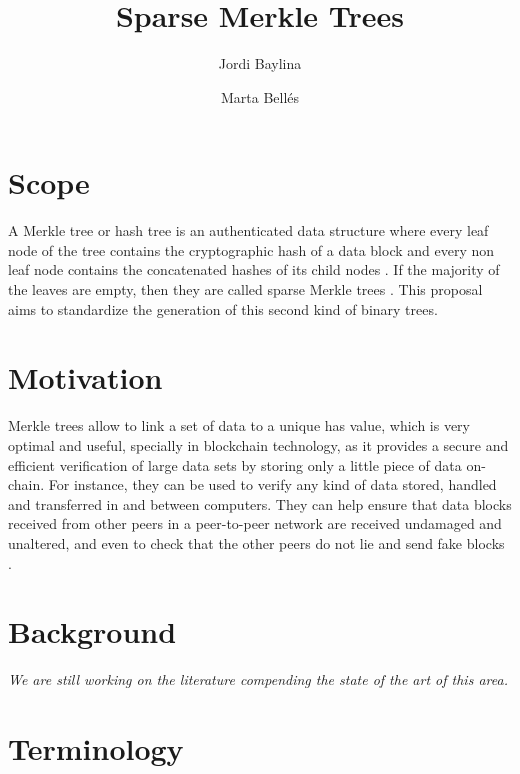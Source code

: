 \documentclass{article}
\title{ Sparse Merkle Trees \vspace{-0.2cm} }
\author[1]{Jordi Baylina}
\author[1,2]{Marta Bellés}
\affil[1]{iden3}
\affil[2]{Universitat Pompeu Fabra}
\date{}
\begin{document}
\begin{spacing}{1.2}

\maketitle 
\vspace{1cm}
\tableofcontents

\vspace{0.5cm}

\newpage
		
\section{Scope}

A Merkle tree or hash tree is an authenticated data structure where every leaf node of the tree contains the cryptographic hash of a data block and every non leaf node contains the concatenated hashes of its child nodes \cite{compact}. If the majority of the leaves are empty, then they are called sparse Merkle trees \cite{security-mt}. This proposal aims to standardize the generation of this second kind of binary trees.
		
\section{Motivation}

Merkle trees allow to link a set of data to a unique has value, which is very optimal and useful, specially in blockchain technology, as it provides a secure and efficient verification of large data sets by storing only a little piece of data on-chain. 
% 
For instance, they can be used to verify any kind of data stored, handled and transferred in and between computers. They can help ensure that data blocks received from other peers in a peer-to-peer network are received undamaged and unaltered, and even to check that the other peers do not lie and send fake blocks \cite{wikipediansdata}. 

		
\section{Background}

{\it We are still working on the literature compending the state of the art of this area.} 

\section{Terminology}


\end{spacing}
\end{document}
